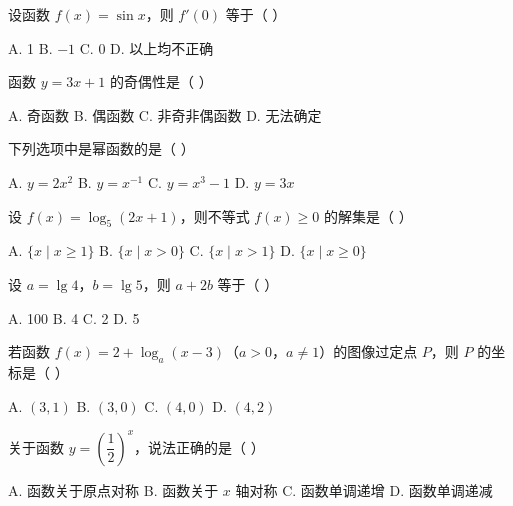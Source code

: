 \documentclass[11pt, a4paper]{article}
\begin{document}
\begin{baitap}[37]
设函数 $f(x)=\sin x$，则 $f'(0)$ 等于（ ）
\par\vspace{3pt}
\noindent A. 1 \quad B. $-1$ \quad C. 0 \quad D. 以上均不正确
\end{baitap}

\begin{baitap}[38]
函数 $y=3x+1$ 的奇偶性是（ ）
\par\vspace{3pt}
\noindent A. 奇函数 \quad B. 偶函数 \quad C. 非奇非偶函数 \quad D. 无法确定
\end{baitap}

\begin{baitap}[39]
下列选项中是幂函数的是（ ）
\par\vspace{3pt}
\noindent A. $y=2x^2$ \quad B. $y=x^{-1}$ \quad C. $y=x^3-1$ \quad D. $y=3x$
\end{baitap}

\begin{baitap}[40]
设 $f(x)=\log_5(2x+1)$，则不等式 $f(x)\ge0$ 的解集是（ ）
\par\vspace{3pt}
\noindent A. $\{x\mid x\ge1\}$ \quad B. $\{x\mid x>0\}$ \quad C. $\{x\mid x>1\}$ \quad D. $\{x\mid x\ge0\}$
\end{baitap}

\begin{baitap}[41]
设 $a=\lg 4$，$b=\lg 5$，则 $a+2b$ 等于（ ）
\par\vspace{3pt}
\noindent A. 100 \quad B. 4 \quad C. 2 \quad D. 5
\end{baitap}

\begin{baitap}[42]
若函数 $f(x)=2+\log_a(x-3)$（$a>0$，$a\ne1$）的图像过定点 $P$，则 $P$ 的坐标是（ ）
\par\vspace{3pt}
\noindent A. $(3,1)$ \quad B. $(3,0)$ \quad C. $(4,0)$ \quad D. $(4,2)$
\end{baitap}

\begin{baitap}[43]
关于函数 $y=\left(\dfrac{1}{2}\right)^x$，说法正确的是（ ）
\par\vspace{3pt}
\noindent A. 函数关于原点对称 \quad B. 函数关于 $x$ 轴对称 \quad C. 函数单调递增 \quad D. 函数单调递减
\end{baitap}
\end{document}
